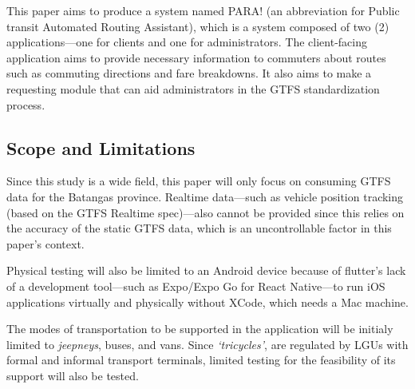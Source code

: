 \documentclass[journal]{./IEEE/IEEEtran}
\begin{document}
This paper aims to produce a system named PARA\@! (an abbreviation for Public transit Automated Routing Assistant), which is a system composed of two (2) applications---one for clients and one for administrators.
The client-facing application aims to provide necessary information to commuters about routes such as commuting directions and fare breakdowns.
It also aims to make a requesting module that can aid administrators in the GTFS standardization process.

\subsection{Scope and Limitations}
Since this study is a wide field, this paper will only focus on consuming GTFS data for the Batangas province. Realtime data---such as vehicle position tracking (based on the GTFS Realtime spec)---also cannot be provided since this relies on the accuracy of the static GTFS data, which is an uncontrollable factor in this paper's context.

Physical testing will also be limited to an Android device because of flutter's lack of a development tool---such as Expo/Expo Go for React Native---to run iOS applications virtually and physically without XCode, which needs a Mac machine.

The modes of transportation to be supported in the application will be initialy limited to \textit{jeepneys}, buses, and vans.  
Since \textit{`tricycles'}, are regulated by LGUs with formal and informal transport terminals, limited testing for the feasibility of its support will also be tested.
\end{document}
